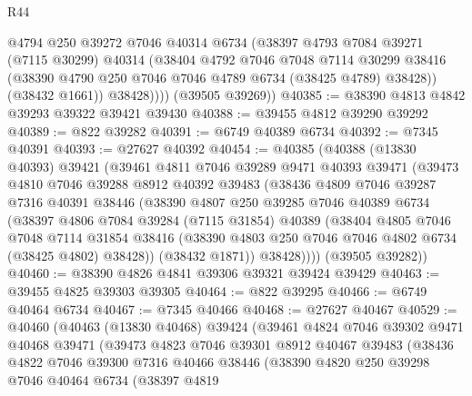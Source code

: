 \begin{lexlean}{R44}
\begin{coremodule}
{              @4794
              @250
              @39272
              @7046
              @40314
              @6734
              (@38397
                @4793
                @7084
                @39271
                (@7115 @30299)
                @40314
                (@38404
                  @4792
                  @7046
                  @7048
                  @7114
                  @30299
                  @38416
                  (@38390 @4790 @250 @7046 @7046 @4789 @6734 (@38425 @4789) @38428))
                (@38432 @1661))
              @38428))))
      (@39505 @39269))
@40385 := @38390 @4813 @4842 @39293 @39322 @39421 @39430
@40388 := @39455 @4812 @39290 @39292
@40389 := @822 @39282
@40391 := @6749 @40389 @6734
@40392 := @7345 @40391
@40393 := @27627 @40392
@40454 := @40385
    (@40388
      (@13830 @40393)
      @39421
      (@39461
        @4811
        @7046
        @39289
        @9471
        @40393
        @39471
        (@39473
          @4810
          @7046
          @39288
          @8912
          @40392
          @39483
          (@38436
            @4809
            @7046
            @39287
            @7316
            @40391
            @38446
            (@38390
              @4807
              @250
              @39285
              @7046
              @40389
              @6734
              (@38397
                @4806
                @7084
                @39284
                (@7115 @31854)
                @40389
                (@38404
                  @4805
                  @7046
                  @7048
                  @7114
                  @31854
                  @38416
                  (@38390 @4803 @250 @7046 @7046 @4802 @6734 (@38425 @4802) @38428))
                (@38432 @1871))
              @38428))))
      (@39505 @39282))
@40460 := @38390 @4826 @4841 @39306 @39321 @39424 @39429
@40463 := @39455 @4825 @39303 @39305
@40464 := @822 @39295
@40466 := @6749 @40464 @6734
@40467 := @7345 @40466
@40468 := @27627 @40467
@40529 := @40460
    (@40463
      (@13830 @40468)
      @39424
      (@39461
        @4824
        @7046
        @39302
        @9471
        @40468
        @39471
        (@39473
          @4823
          @7046
          @39301
          @8912
          @40467
          @39483
          (@38436
            @4822
            @7046
            @39300
            @7316
            @40466
            @38446
            (@38390
              @4820
              @250
              @39298
              @7046
              @40464
              @6734
              (@38397
                @4819
}
\end{coremodule}
\end{lexlean}
